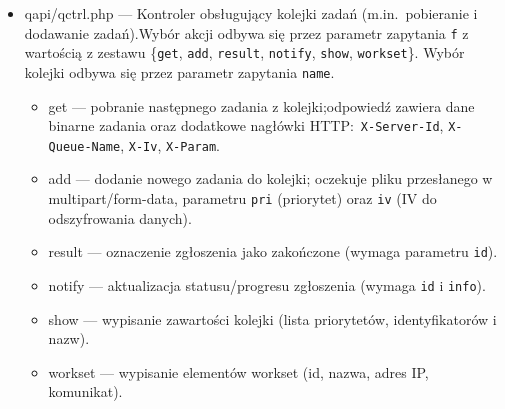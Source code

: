 \documentclass[12pt,a4paper]{article}
\begin{document}
\begin{itemize}
    \item qapi/qctrl.php --- Kontroler obsługujący kolejki zadań (m.in.\ pobieranie i dodawanie zadań).\@ Wybór akcji odbywa się przez parametr zapytania \texttt{f} z wartością z zestawu \{\texttt{get}, \texttt{add}, \texttt{result}, \texttt{notify}, \texttt{show}, \texttt{workset}\}. Wybór kolejki odbywa się przez parametr zapytania \texttt{name}.\@
          \begin{itemize}
              \item get --- pobranie następnego zadania z kolejki;\@ odpowiedź zawiera dane binarne zadania oraz dodatkowe nagłówki HTTP:\ \texttt{X-Server-Id}, \texttt{X-Queue-Name}, \texttt{X-Iv}, \texttt{X-Param}.
              \item add --- dodanie nowego zadania do kolejki; oczekuje pliku przesłanego w multipart/form-data, parametru \texttt{pri} (priorytet) oraz \texttt{iv} (IV do odszyfrowania danych).
              \item result --- oznaczenie zgłoszenia jako zakończone (wymaga parametru \texttt{id}).
              \item notify --- aktualizacja statusu/progresu zgłoszenia (wymaga \texttt{id} i \texttt{info}).
              \item show --- wypisanie zawartości kolejki (lista priorytetów, identyfikatorów i nazw).
              \item workset --- wypisanie elementów workset (id, nazwa, adres IP, komunikat).
          \end{itemize}




\end{itemize}
\end{document}
